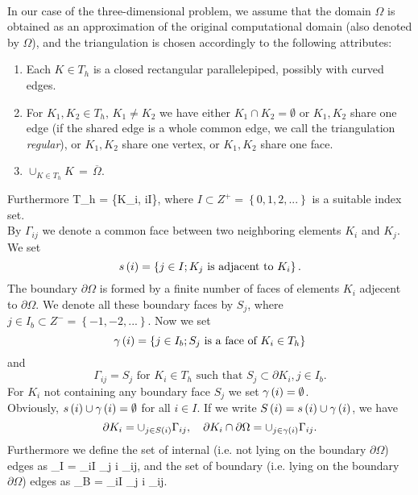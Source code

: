 \paragraph{}
In our case of the three-dimensional problem, we assume that the domain $\Omega$ is obtained as an approximation of the original computational domain (also denoted by $\Omega$), and the triangulation is chosen accordingly to the following attributes:
\renewcommand{\labelenumi}{\Alph{enumi})}
\begin{enumerate}
    \item Each $K\in T_h$ is a closed rectangular parallelepiped, possibly with curved edges.
    \item For $K_1,K_2\in T_h,\,K_1\neq{K}_2$ we have either $K_1\cap{K}_2 = \emptyset$ or $K_1,K_2$ share one edge (if the shared edge is a whole common edge, we call the triangulation \emph{regular}), or $K_1,K_2$ share one vertex, or $K_1,K_2$ share one face.
    \item$\cup_{K\in T_h}K\,=\,\overline{\Omega}.$
\end{enumerate}
Furthermore
\be
\label{Idef}  T_h = \left\{K_i, i\in I\right\},
\ee
where $I\subset Z^+ = \left\{0, 1, 2, ...\right\}$ is a suitable index set.\\
By $\Gamma_{ij}$ we denote a common face between two
neighboring elements $K_i$ and $K_j$. We set 
$$s
\left( i\right) = \left\{j\in I; K_j \text{ is adjacent to } K_i\right\}.
$$
The boundary $\partial\Omega$ is formed by a finite number of faces of elements $K_i$ adjecent to
$\partial\Omega$. We denote all these boundary faces by $S_j$, where $j\in I_b\subset Z^{-} = \left\{-1, -2, ...\right\}$.
Now we set 
$$
\gamma\left( i \right) = \left\{j\in I_b; S_j \text{ is a face of } K_i\in T_h\right\}
$$ 
and 
$$
\Gamma_{ij} = S_j\text{ for } K_i\in  T_h\text{ such that }S_j\subset\partial K_i, j\in I_b.
$$
For $K_i$ not containing any boundary face $S_j$ we set $\gamma\left( i \right) = \emptyset$.\\
Obviously, $s\left( i \right) \cup\gamma\left( i\right) = \emptyset$ for all $i\in I$. If we write $S\left( i \right) = s \left( i\right) \cup \gamma\left( i \right)$, we have
$$
\partial K_i = \cup_{j\in S\left( i \right)}\Gamma_{ij},\ \ \ \partial K_i\cap\partial{\Omega} = \cup_{j\in\gamma\left( i \right)}\Gamma_{ij}.
$$
Furthermore we define the set of internal (i.e. not lying on the boundary $\partial\Omega$) edges as
\be
\label{InternalEdges} \Gamma_I = \cup_{i\in I} \cup_{j \notin \gamma\lo i \ro} \Gamma_{ij},
\ee
and the set of boundary (i.e. lying on the boundary $\partial\Omega$) edges as
\be
\label{BndEdges} \Gamma_B = \cup_{i\in I} \cup_{j \in \gamma\lo i \ro} \Gamma_{ij}.
\ee
